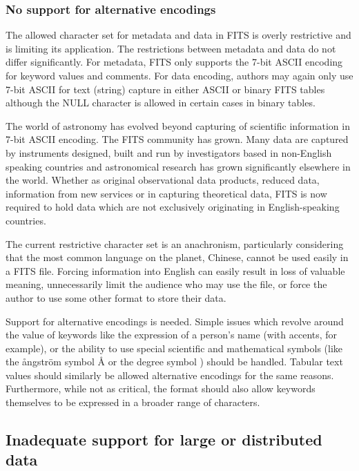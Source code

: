 \documentclass[final,authoryear,5p,times,twocolumn]{elsarticle}
\begin{document}
{{\subsubsection{No support for alternative encodings}
\label{section_char_encoding}

The allowed character set for metadata and data in FITS is overly
restrictive and is limiting its application. The restrictions between
metadata and data do not differ significantly. For metadata,
FITS only supports the 7-bit
ASCII encoding for keyword values and comments. For data encoding,
authors may again only use 7-bit ASCII for text (string) capture in
either ASCII or binary FITS tables although the NULL character is
allowed in certain cases in binary tables.


The world of astronomy has evolved beyond capturing of scientific
information in 7-bit ASCII encoding. The FITS community has grown.
Many data are captured by instruments designed, built and run by
investigators based in non-English speaking countries and astronomical
research has grown significantly elsewhere in the world. Whether as
original observational data products, reduced data, information from new
services or in capturing theoretical data, FITS is now required to hold
data which are not exclusively originating in English-speaking countries.


The current restrictive character set is an
anachronism, particularly considering that the most common language on the planet,
Chinese, cannot be used easily in a FITS file. Forcing information
into English can easily result in loss of valuable meaning, unnecessarily
limit the audience who may use the file, or force the author to use some other
format to store their data.


Support for alternative encodings is needed.
Simple issues which revolve around the value of keywords like the
expression of a person's name (with accents, for example), or the
ability to use special scientific and mathematical symbols (like the
\r{a}ngstr\"{o}m symbol \r{A} or the degree symbol \degree) should be
handled. Tabular text values should similarly be allowed alternative
encodings for the same reasons.  Furthermore, while not as critical, the
format should also allow keywords themselves to be expressed in a broader
range of characters.


\subsection{Inadequate support for large or distributed data}
\label{section_poor_large_data_support}

}}
\end{document}
